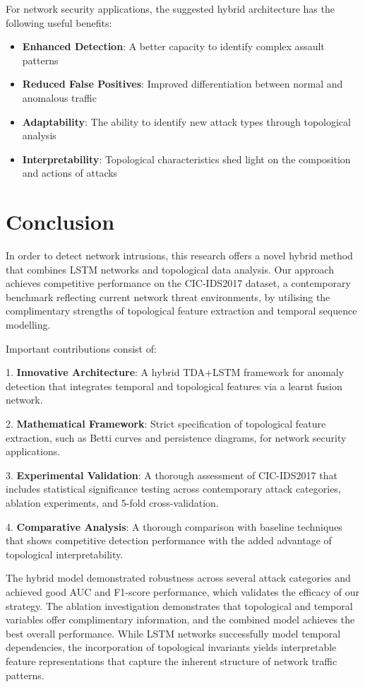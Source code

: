 \documentclass[conference]{IEEEtran}
\begin{document}
For network security applications, the suggested hybrid architecture has the following useful benefits:

\begin{itemize}
\item \textbf{Enhanced Detection}: A better capacity to identify complex assault patterns
\item \textbf{Reduced False Positives}: Improved differentiation between normal and anomalous traffic
\item \textbf{Adaptability}: The ability to identify new attack types through topological analysis
\item \textbf{Interpretability}: Topological characteristics shed light on the composition and actions of attacks
\end{itemize}

\section{Conclusion}

In order to detect network intrusions, this research offers a novel hybrid method that combines LSTM networks and topological data analysis. Our approach achieves competitive performance on the CIC-IDS2017 dataset, a contemporary benchmark reflecting current network threat environments, by utilising the complimentary strengths of topological feature extraction and temporal sequence modelling.

Important contributions consist of:

1. \textbf{Innovative Architecture}: A hybrid TDA+LSTM framework for anomaly detection that integrates temporal and topological features via a learnt fusion network.

2. \textbf{Mathematical Framework}: Strict specification of topological feature extraction, such as Betti curves and persistence diagrams, for network security applications.

3. \textbf{Experimental Validation}: A thorough assessment of CIC-IDS2017 that includes statistical significance testing across contemporary attack categories, ablation experiments, and 5-fold cross-validation.

4. \textbf{Comparative Analysis}: A thorough comparison with baseline techniques that shows competitive detection performance with the added advantage of topological interpretability.

The hybrid model demonstrated robustness across several attack categories and achieved good AUC and F1-score performance, which validates the efficacy of our strategy. The ablation investigation demonstrates that topological and temporal variables offer complimentary information, and the combined model achieves the best overall performance. While LSTM networks successfully model temporal dependencies, the incorporation of topological invariants yields interpretable feature representations that capture the inherent structure of network traffic patterns.
\end{document}
